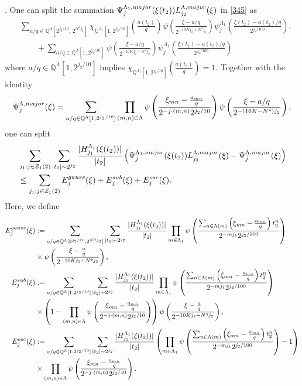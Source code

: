 \documentclass[10pt,a4paper]{amsart}
\numberwithin{equation}{section}
\begin{document}
. One can split the summation $\Psi^{\Lambda_1,\rm{major}}_{j}(\xi(t_2))L^{\Lambda,\rm{major}}_{j_2}(\xi)$  in \eqref{345} as
\begin{align*}
&\sum_{ a/q\in  \mathbb{Q}^{\Lambda}[2^{j_2/10},\,2^{N^4 j_2}]}\chi_{\mathbb Q^{\Lambda_1}[1,2^{j_2/10}]}
\!\left(\frac{a(t_2)}{q}\right)
\psi\!\left(
\frac{\xi-a/q}{2^{-10Kj_2+N^4j_2}}
\right)
\psi^{\Lambda_1}_{j}\!\left(
\frac{\xi(t_2)-a(t_2)/q}{2^{j_2/100}}
\right).\\
&\qquad+ \sum_{a/q\in  \mathbb{Q}^{\Lambda}[1,2^{j_2/10}]} 
\psi\!\left(
\frac{\xi-a/q}{2^{-10Kj_2+N^4j_2}}
\right)
\psi^{\Lambda_1}_{j}\!\left(
\frac{\xi(t_2)-a(t_2)/q}{2^{j_2/100}}
\right)
\end{align*}
where    $a/q \in \mathbb{Q}^{\Lambda}[1,2^{j_2/10}]$ implies $ \chi_{\mathbb Q^{\Lambda_1}[1,2^{j_2/10}]}
\!\left(\frac{a(t_2)}{q}\right)=1.$
Together with the identity $$\Psi^{\Lambda,\rm{major}}_{j}(\xi)= \sum_{a/q\in  \mathbb{Q}^{\Lambda}[1, 2^{j_2/10}] } \prod_{(m,n)\in \Lambda}\psi\left(  \frac{  \xi_{mn}-\frac{a_{mn}}{q}}{ 2^{-j\cdot (m,n)}2^{j_2/10}} \right) \psi\left(\frac{\xi-a/q}{2^{-(10K-N^4)j_2}}\right),$$ one can split  
\begin{align*}
	&\sum_{j_1:j\in Z_1(2)}  \sum_{|t_2|\sim 2^{j_2}}    \frac{|H^{\Lambda_1}_{j_1}(\xi(t_2))|}{|t_2|}  \left(\Psi^{\Lambda_1,\rm{major}}_{j}(\xi(t_2))L^{\Lambda,\rm{major}}_{j_2}(\xi)-\Psi^{\Lambda,\rm{major}}_{j}(\xi)\right) \\
	&\le  \sum_{j_1:j\in Z_1(2)} E_j^{\rm{gauss}}(\xi)+E_j^{\rm{sub}}(\xi) +E_j^{\rm{osc}}(\xi). 
\end{align*}
Here, we define
\begin{align}
	E^{\rm{gauss}}_j(\xi)&:= \sum_{ a/q\in \mathbb{Q}^{\Lambda}[2^{j_2/10},2^{N^4 j_2}]}  \sum_{|t_2|\sim 2^{j_2}}    \frac{|H^{\Lambda_1}_{j_1}(\xi(t_2))|}{|t_2|}    \prod_{m\in\Lambda_1}\psi\left( \frac{\sum_{n\in\Lambda(m)}\left( \xi_{mn}-\frac{a_{mn}}{q} \right)t_2^n }{2^{-mj_1} 2^{ j_2/100}} \right) \nonumber \\
	&\times \psi\left(\frac{\xi-\frac{a}{q}}{2^{-10Kj_2+N^4j_2}}\right), \nonumber\\
	E^{\rm{sub}}_j(\xi)&:=  \sum_{ a/q\in \mathbb{Q}^{\Lambda}[1,2^{j_2/10}]}  \sum_{|t_2|\sim 2^{j_2}}   \frac{|H^{\Lambda_1}_{j_1}(\xi(t_2))|}{|t_2|}   \prod_{m\in\Lambda_1}\psi\left( \frac{\sum_{n\in\Lambda(m)}\left( \xi_{mn}-\frac{a_{mn}}{q} \right)t_2^n }{2^{-mj_1} 2^{ j_2/100}} \right)\nonumber \\
	&\times \left(1-\prod_{(m,n)\in\Lambda}\psi\left(  \frac{  \xi_{mn}-\frac{a_{mn}}{q}}{ 2^{-j\cdot (m,n)}2^{j_2/10}} \right)\right)   \psi\left(\frac{\xi-\frac{a}{q}}{2^{-10Kj_2+N^4j_2}}\right),    \notag\\
	E^{\rm{osc}}_j(\xi)&:=   \sum_{ a/q\in \mathbb{Q}^{\Lambda}[1,2^{j_2/10}]}  \sum_{|t_2|\sim 2^{j_2}}   \frac{|H^{\Lambda_1}_{j_1}(\xi(t_2))|}{|t_2|}  \left(  \prod_{m\in\Lambda_1}\psi\left( \frac{\sum_{n\in\Lambda(m)}\left( \xi_{mn}-\frac{a_{mn}}{q} \right)t_2^n }{2^{-mj_1} 2^{ j_2/100}} \right) -1\right)\notag\\
	&\times  \prod_{(m,n)\in\Lambda}\psi\left(  \frac{  \xi_{mn}-\frac{a_{mn}}{q}}{ 2^{-j\cdot (m,n)}2^{j_2/10}} \right).\nonumber
\end{align}
\end{document}
